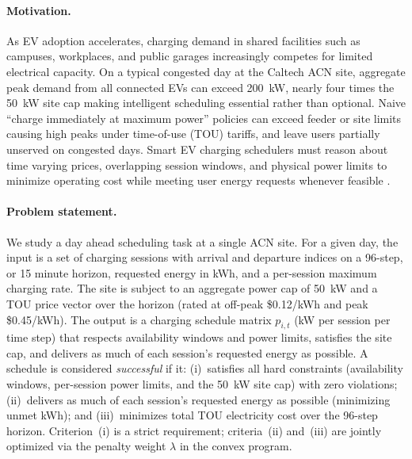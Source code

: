 \documentclass{article}
\begin{document}
\paragraph{Motivation.}
As EV adoption accelerates, charging demand in shared facilities such as campuses, workplaces, and public garages increasingly competes for limited electrical capacity. On a typical congested day at the Caltech ACN site, aggregate peak demand from all connected EVs can exceed 200~kW, nearly four times the 50~kW site cap making intelligent scheduling essential rather than optional. Naive ``charge immediately at maximum power'' policies can exceed feeder or site limits causing high peaks under time-of-use (TOU) tariffs, and leave users partially unserved on congested days. Smart EV charging schedulers must reason about time varying prices, overlapping session windows, and physical power limits to minimize operating cost while meeting user energy requests whenever feasible \cite{lee2020acn}.

\paragraph{Problem statement.}
We study a day ahead scheduling task at a single ACN site. For a given day, the input is a set of charging sessions with arrival and departure indices on a 96-step, or 15 minute horizon, requested energy in kWh, and a per-session maximum charging rate. The site is subject to an aggregate power cap of 50~kW and a TOU price vector over the horizon (rated at off-peak \$0.12/kWh and peak \$0.45/kWh). The output is a charging schedule matrix $p_{i,t}$ (kW per session per time step) that respects availability windows and power limits, satisfies the site cap, and delivers as much of each session's requested energy as possible. A schedule is considered \emph{successful} if it: (i)~satisfies all hard constraints (availability windows, per-session power limits, and the 50~kW site cap) with zero violations; (ii)~delivers as much of each session's requested energy as possible (minimizing unmet kWh); and (iii)~minimizes total TOU electricity cost over the 96-step horizon. Criterion~(i) is a strict requirement; criteria~(ii) and~(iii) are jointly optimized via the penalty weight $\lambda$ in the convex program.
\end{document}
